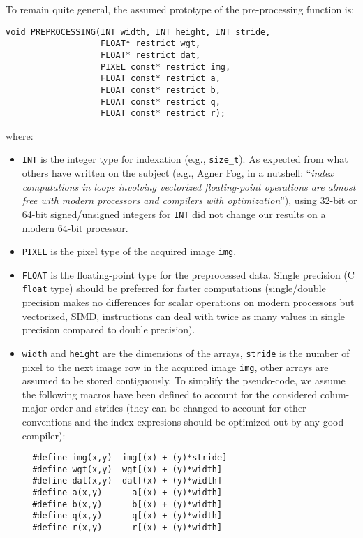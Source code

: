 \documentclass[10pt]{article}
\begin{document}
To remain quite general, the assumed prototype of the pre-processing
function is:
\begin{verbatim}
void PREPROCESSING(INT width, INT height, INT stride,
                   FLOAT* restrict wgt,
                   FLOAT* restrict dat,
                   PIXEL const* restrict img,
                   FLOAT const* restrict a,
                   FLOAT const* restrict b,
                   FLOAT const* restrict q,
                   FLOAT const* restrict r);
\end{verbatim}
where:
\begin{itemize}
\item \verb+INT+ is the integer type for indexation (e.g.,
  \verb+size_t+).  As expected from what others have written on the
  subject (e.g., Agner Fog, in a nutshell: ``\emph{index computations
    in loops involving vectorized floating-point operations are almost
    free with modern processors and compilers with optimization}''),
  using 32-bit or 64-bit signed/unsigned integers for \verb+INT+ did
  not change our results on a modern 64-bit processor.

\item \verb+PIXEL+ is the pixel type of the acquired image \verb+img+.

\item \verb+FLOAT+ is the floating-point type for the preprocessed
  data.  Single precision (C \verb+float+ type) should be preferred
  for faster computations (single/double precision makes no
  differences for scalar operations on modern processors but
  vectorized, SIMD, instructions can deal with twice as many values in
  single precision compared to double precision).

\item \verb+width+ and \verb+height+ are the dimensions of the arrays,
  \verb+stride+ is the number of pixel to the next image row in the
  acquired image \verb+img+, other arrays are assumed to be stored
  contiguously. To simplify the pseudo-code, we assume the following
  macros have been defined to account for the considered colum-major
  order and strides (they can be changed to account for other
  conventions and the index expresions should be optimized out by any
  good compiler):
  \begin{verbatim}
  #define img(x,y)  img[(x) + (y)*stride]
  #define wgt(x,y)  wgt[(x) + (y)*width]
  #define dat(x,y)  dat[(x) + (y)*width]
  #define a(x,y)      a[(x) + (y)*width]
  #define b(x,y)      b[(x) + (y)*width]
  #define q(x,y)      q[(x) + (y)*width]
  #define r(x,y)      r[(x) + (y)*width]
  \end{verbatim}


\end{itemize}
\end{document}
